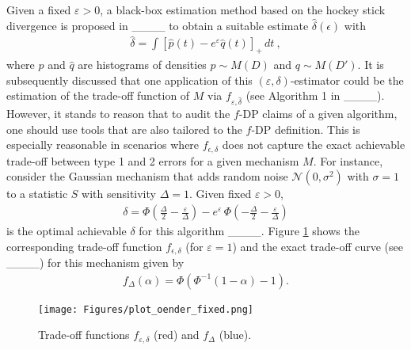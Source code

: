 Given a fixed $\varepsilon >0$, a black-box estimation method based on the hockey stick divergence is proposed in ____ to obtain a suitable estimate $\hat{\delta}(\epsilon)$ with 
\begin{align*}
  \hat{\delta} = \int \left[ \hat{p}(t) - e^{\varepsilon} \hat{q}(t) \right]_+  \, dt ~,
\end{align*}
where $\hat{p}$ and $\hat{q}$ are histograms of densities $p \sim M(D)$ and $q \sim M(D')$. 
It is subsequently discussed that one application of this $(\varepsilon, \delta)$-estimator could be the estimation of the trade-off function of $M$ via $f_{\varepsilon,\hat{\delta}}$ (see Algorithm 1 in ____). However, it stands to reason that to audit the $f$-DP claims of a given algorithm, one should use tools that are also tailored to the $f$-DP definition. %
This is especially reasonable in scenarios where $f_{\epsilon,\delta} $ does not capture the exact achievable trade-off between type 1 and 2 errors for a given mechanism $M$. 
For instance, consider the Gaussian mechanism that adds random noise $\mathcal{N}(0, \sigma^2)$ with $\sigma = 1$ to a statistic $S$ with sensitivity $\Delta = 1$. Given fixed $\varepsilon > 0$, 
\begin{align*}
    \delta = \Phi \left( \frac{\Delta}{2} - \frac{\varepsilon}{\Delta}  \right) - e^{\varepsilon} \, \Phi \left( - \frac{\Delta}{2} - \frac{\varepsilon}{\Delta}  \right) 
\end{align*}
is the optimal achievable $\delta$ for this algorithm ____. Figure \ref{Fig_f_epsilon_delta} shows the corresponding trade-off function $f_{\epsilon,\delta}$ (for $\varepsilon = 1$) and the exact trade-off curve (see ____) for this mechanism given by 
\begin{align*}
    f_{\Delta}(\alpha) = \Phi(\Phi^{-1}(1 - \alpha) - 1).
\end{align*}


\begin{figure}
\centering
\texttt{[image: Figures/plot\_oender\_fixed.png]}
\caption{Trade-off functions $f_{\varepsilon, \delta}$ (red) and $f_{\Delta}$ (blue).} 
\label{Fig_f_epsilon_delta}
\end{figure}

